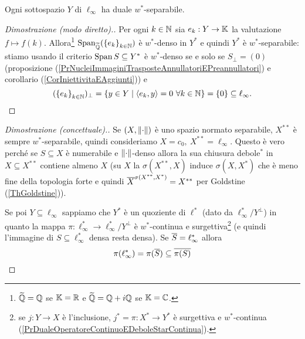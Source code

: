 \begin{lemma}
Ogni sottospazio $Y$ di $\ell_\infty$ ha duale $w^\ast$-separabile.
\end{lemma}
\begin{proof}[Dimostrazione (modo diretto).]
Per ogni $k\in\mathbb{N}$ sia $e_k:Y\to \mathbb{K}$ la valutazione $f\mapsto f(k)$. Allora\footnote{$\widetilde{\mathbb{Q}}=\mathbb{Q}$ se $\mathbb{K}=\mathbb{R}$ e $\widetilde{\mathbb{Q}}=\mathbb{Q}+i\mathbb{Q}$ se $\mathbb{K}=\mathbb{C}$.} $\operatorname{Span}_{\widetilde{\mathbb{Q}}}(\left\{{e_k}\right\}_{k\in\mathbb{N}})$ \`e $w^\ast$-denso in $Y^\ast$ e quindi $Y^\ast$ \`e $w^\ast$-separabile: stiamo usando il criterio $\operatorname{Span} S\subseteq Y^\ast$ \`e $w^\ast$-denso se e solo se $S_\perp=(0)$ (proposizione (\ref{PrNucleiImmaginiTrasposteAnnullatoriEPreannullatori}) e corollario (\ref{CorIniettivitaEAggiunti})) e 
\[(\left\{{e_k}\right\}_{k\in\mathbb{N}})_\perp=\left\{{y\in Y\mid \left\langle {e_k,y}\right\rangle=0\ \forall k\in\mathbb{N}}\right\}=\left\{{0}\right\}\subseteq \ell_\infty.\]
\end{proof}
\begin{proof}[Dimostrazione (concettuale).]
Se $(X,{\left\Vert{\cdot}\right\Vert})$ \`e uno spazio normato separabile, $X^{\ast\ast}$ \`e sempre $w^\ast$-separabile, quindi consideriamo $X=c_0,\ X^{\ast\ast}=\ell_\infty$. Questo \`e vero perch\'e se $S\subseteq X$ \`e numerabile e ${\left\Vert{\cdot}\right\Vert}$-denso allora la sua chiusura debole$^\ast$ in $X\subseteq X^{\ast\ast}$ contiene almeno $X$ (su $X$ la $\sigma(X^{\ast\ast},X)$ induce $\sigma(X,X^\ast)$ che \`e meno fine della topologia forte e quindi $\overline{X}^{\sigma(X^{\ast\ast},X^\ast)}=X^{\ast\ast}$ per Goldstine (\ref{ThGoldstine})).

Se poi $Y\subseteq \ell_\infty$ sappiamo che $Y^\ast$ \`e un quoziente di $\ell^\ast$ (dato da $\ell_\infty^\ast/Y^\perp$) in quanto la mappa $\pi:\ell^\ast_\infty\to \ell^\ast_\infty/Y^\perp$ \`e $w^\ast$-continua e surgettiva\footnote{se $j:Y\to X$ \`e l'inclusione, $j^\ast=\pi:X^\ast\to Y^\ast$ \`e surgettiva e $w^\ast$-continua (\ref{PrDualeOperatoreContinuoEDeboleStarContinua}).} (e quindi l'immagine di $S\subseteq \ell_\infty^\ast$ densa resta densa). Se $\overline{S}=\ell_\infty^\ast$ allora
\[\pi(\ell^\ast_\infty)=\pi(\overline{S})\subseteq \overline{\pi(S)}\]
\end{proof}

